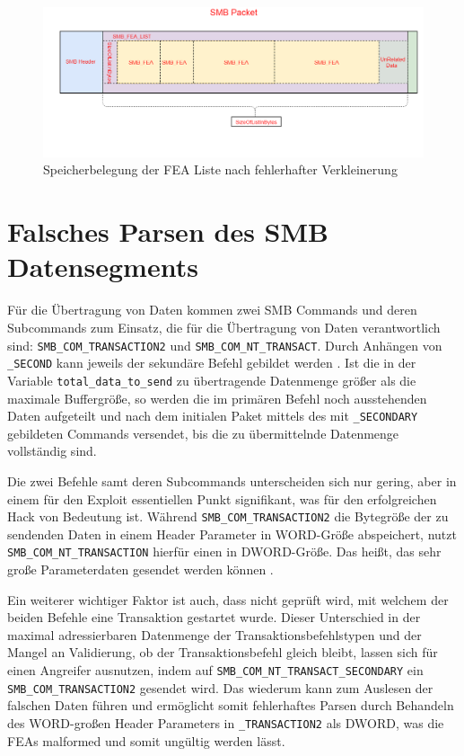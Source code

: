 \documentclass[DIV=12,headings=normal,pdftex,headinclude=false,footinclude=false,final]{scrreprt}
\begin{document}
\begin{figure}[H]
    \centering
    \includegraphics[width=15cm]{checkpoint_after_shrink_error.png}
    \caption[FEAList nach fehlerhafter Verkleinerung, Nadav Grossmann (Checkpoint Research), URL: \url{https://research.checkpoint.com/wp-content/uploads/2017/09/eternalblue6.png}]{Speicherbelegung der FEA Liste nach fehlerhafter Verkleinerung}
    \label{img:fealist_after_shrinking_incorrectly}
\end{figure}

\section{Falsches Parsen des SMB Datensegments}
Für die Übertragung von Daten kommen zwei SMB Commands und deren Subcommands zum Einsatz, die für die Übertragung von Daten verantwortlich sind: \verb|SMB_COM_TRANSACTION2| und \verb|SMB_COM_NT_TRANSACT|. Durch Anhängen von \verb|_SECOND| kann jeweils der sekundäre Befehl gebildet werden \cite{MS:SMBCom}. Ist die in der Variable \verb|total_data_to_send| zu übertragende Datenmenge größer als die maximale Buffergröße, so werden die im primären Befehl noch ausstehenden Daten aufgeteilt und nach dem initialen Paket mittels des mit \verb|_SECONDARY|  gebildeten Commands versendet, bis die zu übermittelnde Datenmenge vollständig sind\cite{TM:EB}.

\noindent
Die zwei Befehle samt deren Subcommands unterscheiden sich nur gering, aber in einem für den Exploit essentiellen Punkt signifikant, was für den erfolgreichen Hack von Bedeutung ist. Während \verb|SMB_COM_TRANSACTION2| die Bytegröße der zu sendenden Daten in einem Header Parameter in WORD-Größe abspeichert, nutzt \verb|SMB_COM_NT_TRANSACTION| hierfür einen in DWORD-Größe. Das heißt, das sehr große Parameterdaten gesendet werden können \cite{CP}.

\noindent
Ein weiterer wichtiger Faktor ist auch, dass nicht geprüft wird, mit welchem der beiden Befehle eine Transaktion gestartet wurde. Dieser Unterschied in der maximal adressierbaren Datenmenge der Transaktionsbefehlstypen und der Mangel an Validierung, ob der Transaktionsbefehl gleich bleibt, lassen sich für einen Angreifer ausnutzen, indem auf \verb|SMB_COM_NT_TRANSACT_SECONDARY| ein \verb|SMB_COM_TRANSACTION2| gesendet wird. Das wiederum kann zum Auslesen der falschen Daten führen und ermöglicht somit fehlerhaftes Parsen durch Behandeln des WORD-großen Header Parameters in \verb|_TRANSACTION2| als DWORD, was die FEAs malformed und somit ungültig werden lässt\cite{CP}.
\end{document}
